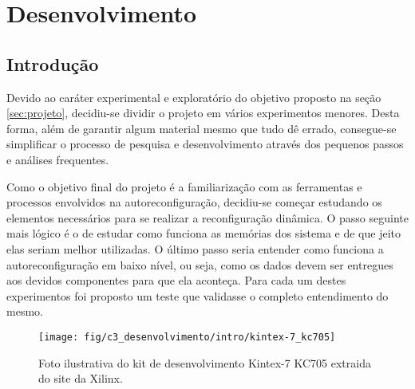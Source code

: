 \documentclass[11pt,a4paper,oneside]{book}
\begin{document}
	\frontmatter
	\listoftodos
	\tableofcontents
	\mainmatter
	
	\newcommand\qt[1]{\lq\lq{}#1\rq\rq{}}
	\newcommand\qti[1]{\lq\lq{}\textit{#1}\rq\rq{}}
\fi

                      
\chapter{Desenvolvimento}\label{CapDesenvolvimento}


\section{Introdu\c{c}\~{a}o}
Devido ao caráter experimental e exploratório do objetivo proposto na seção \ref{sec:projeto}, decidiu-se dividir o projeto em vários experimentos menores.
Desta forma, além de garantir algum material mesmo que tudo dê errado, consegue-se simplificar o processo de pesquisa e desenvolvimento através dos pequenos passos e análises frequentes.

Como o objetivo final do projeto é a familiarização com as ferramentas e processos envolvidos na autoreconfiguração, decidiu-se começar estudando os elementos necessários para se realizar a reconfiguração dinâmica.
O passo seguinte mais lógico é o de estudar como funciona as memórias dos sistema e de que jeito elas seriam melhor utilizadas.
O último passo seria entender como funciona a autoreconfiguração em baixo nível, ou seja, como os dados devem ser entregues aos devidos componentes para que ela aconteça.
Para cada um destes experimentos foi proposto um teste que validasse o completo entendimento do mesmo.

\begin{figure}[h]
\centering
\texttt{[image: fig/c3\_desenvolvimento/intro/kintex-7\_kc705]}
\caption{Foto ilustrativa do kit de desenvolvimento Kintex-7 KC705 extraida do site da Xilinx.}
\label{fig:kc705}
\end{figure}
\end{document}
